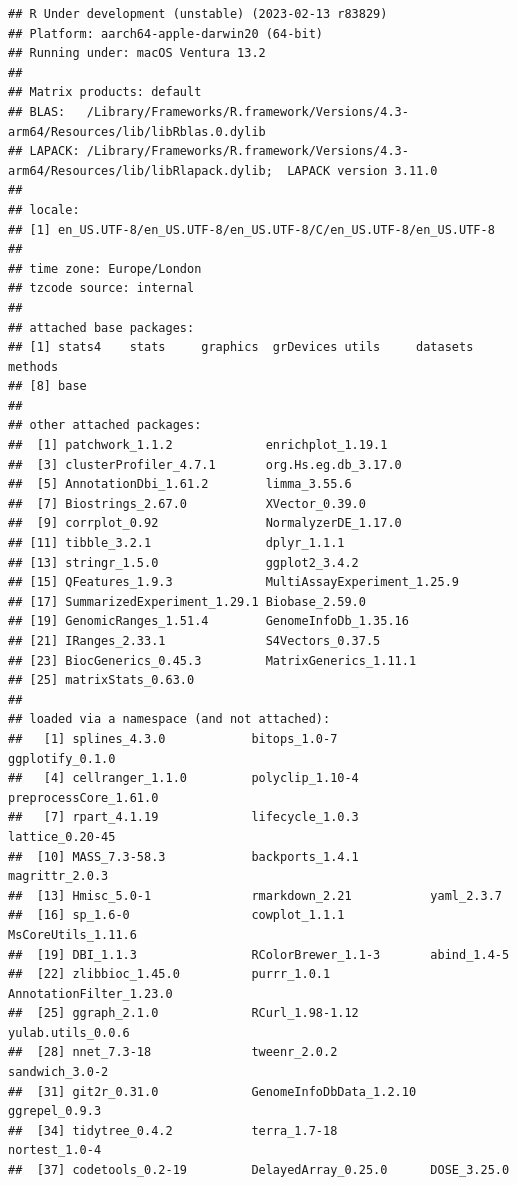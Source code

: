 \documentclass[9pt,a4paper,]{extarticle}
\begin{document}
\begin{verbatim}
## R Under development (unstable) (2023-02-13 r83829)
## Platform: aarch64-apple-darwin20 (64-bit)
## Running under: macOS Ventura 13.2
## 
## Matrix products: default
## BLAS:   /Library/Frameworks/R.framework/Versions/4.3-arm64/Resources/lib/libRblas.0.dylib 
## LAPACK: /Library/Frameworks/R.framework/Versions/4.3-arm64/Resources/lib/libRlapack.dylib;  LAPACK version 3.11.0
## 
## locale:
## [1] en_US.UTF-8/en_US.UTF-8/en_US.UTF-8/C/en_US.UTF-8/en_US.UTF-8
## 
## time zone: Europe/London
## tzcode source: internal
## 
## attached base packages:
## [1] stats4    stats     graphics  grDevices utils     datasets  methods  
## [8] base     
## 
## other attached packages:
##  [1] patchwork_1.1.2             enrichplot_1.19.1          
##  [3] clusterProfiler_4.7.1       org.Hs.eg.db_3.17.0        
##  [5] AnnotationDbi_1.61.2        limma_3.55.6               
##  [7] Biostrings_2.67.0           XVector_0.39.0             
##  [9] corrplot_0.92               NormalyzerDE_1.17.0        
## [11] tibble_3.2.1                dplyr_1.1.1                
## [13] stringr_1.5.0               ggplot2_3.4.2              
## [15] QFeatures_1.9.3             MultiAssayExperiment_1.25.9
## [17] SummarizedExperiment_1.29.1 Biobase_2.59.0             
## [19] GenomicRanges_1.51.4        GenomeInfoDb_1.35.16       
## [21] IRanges_2.33.1              S4Vectors_0.37.5           
## [23] BiocGenerics_0.45.3         MatrixGenerics_1.11.1      
## [25] matrixStats_0.63.0         
## 
## loaded via a namespace (and not attached):
##   [1] splines_4.3.0            bitops_1.0-7             ggplotify_0.1.0         
##   [4] cellranger_1.1.0         polyclip_1.10-4          preprocessCore_1.61.0   
##   [7] rpart_4.1.19             lifecycle_1.0.3          lattice_0.20-45         
##  [10] MASS_7.3-58.3            backports_1.4.1          magrittr_2.0.3          
##  [13] Hmisc_5.0-1              rmarkdown_2.21           yaml_2.3.7              
##  [16] sp_1.6-0                 cowplot_1.1.1            MsCoreUtils_1.11.6      
##  [19] DBI_1.1.3                RColorBrewer_1.1-3       abind_1.4-5             
##  [22] zlibbioc_1.45.0          purrr_1.0.1              AnnotationFilter_1.23.0 
##  [25] ggraph_2.1.0             RCurl_1.98-1.12          yulab.utils_0.0.6       
##  [28] nnet_7.3-18              tweenr_2.0.2             sandwich_3.0-2          
##  [31] git2r_0.31.0             GenomeInfoDbData_1.2.10  ggrepel_0.9.3           
##  [34] tidytree_0.4.2           terra_1.7-18             nortest_1.0-4           
##  [37] codetools_0.2-19         DelayedArray_0.25.0      DOSE_3.25.0             

\end{verbatim}
\end{document}
